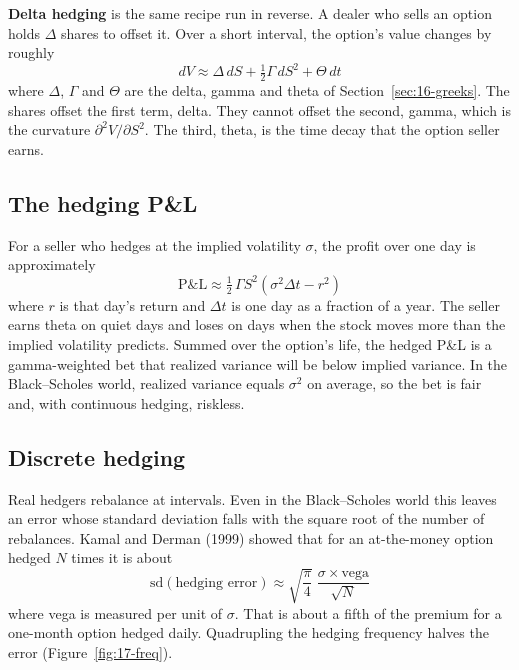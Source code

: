 \textbf{Delta hedging} is the same recipe run in reverse. A dealer who sells an option holds $\Delta$ shares to offset it. Over a short interval, the option's value changes by roughly
\begin{equation}
  dV \approx \Delta\,dS + \tfrac{1}{2}\Gamma\,dS^2 + \Theta\,dt
  \label{eq:17-taylor}
\end{equation}
where $\Delta$, $\Gamma$ and $\Theta$ are the delta, gamma and theta of Section~\ref{sec:16-greeks}. The shares offset the first term, delta. They cannot offset the second, gamma, which is the curvature $\partial^2 V/\partial S^2$. The third, theta, is the time decay that the option seller earns.

\subsection{The hedging P\&L}

For a seller who hedges at the implied volatility $\sigma$, the profit over one day is approximately
\begin{equation}
  \text{P\&L} \approx \tfrac{1}{2}\,\Gamma S^2 \left(\sigma^2 \Delta t - r^2\right)
  \label{eq:17-pnl}
\end{equation}
where $r$ is that day's return and $\Delta t$ is one day as a fraction of a year. The seller earns theta on quiet days and loses on days when the stock moves more than the implied volatility predicts. Summed over the option's life, the hedged P\&L is a gamma-weighted bet that realized variance will be below implied variance. In the Black--Scholes world, realized variance equals $\sigma^2$ on average, so the bet is fair and, with continuous hedging, riskless.

\subsection{Discrete hedging}

Real hedgers rebalance at intervals. Even in the Black--Scholes world this leaves an error whose standard deviation falls with the square root of the number of rebalances. Kamal and Derman (1999) showed that for an at-the-money option hedged $N$ times it is about
\begin{equation}
  \mathrm{sd}(\text{hedging error}) \approx \sqrt{\frac{\pi}{4}}\;\frac{\sigma \times \text{vega}}{\sqrt{N}}
  \label{eq:17-kd}
\end{equation}
where vega is measured per unit of $\sigma$. That is about a fifth of the premium for a one-month option hedged daily. Quadrupling the hedging frequency halves the error (Figure~\ref{fig:17-freq}).

